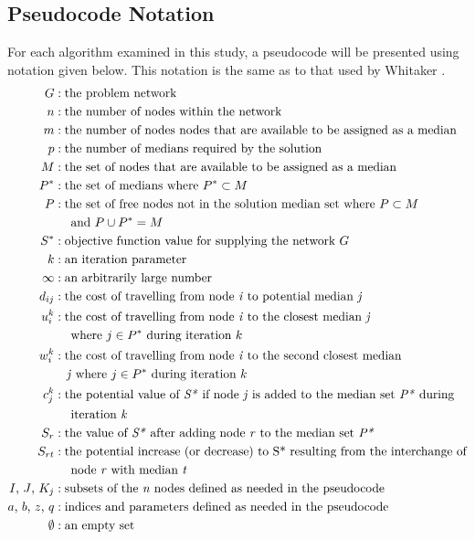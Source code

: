 \documentclass[11pt]{article}
\begin{document}
	\subsection{Pseudocode Notation} \label{pseudocode.notation}
	For each algorithm examined in this study, a pseudocode will be presented using notation given below.  This notation is the same as to that used by Whitaker \cite{WHIT83}.
	\begin{align*}
	G &: \text{the problem network}\\
	n &: \text{the number of nodes within the network}\\
	m &: \text{the number of nodes nodes that are available to be assigned as a median}\\
	p &: \text{the number of medians required by the solution}\\
	M &: \text{the set of nodes that are available to be assigned as a median}\\
	P^{*} &: \text{the set of medians where } P^{*} \subset M\\
	P &: \text{the set of free nodes not in the solution median set where } P \subset M\\
			& \quad \text{ and } P \cup P^{*} = M\\
	S^{*} &: \text{objective function value for supplying the network } G\\
	k &: \text{an iteration parameter}\\
	\infty &: \text{an arbitrarily large number}\\
	d_{ij} &: \text{the cost of travelling from node \emph{i} to potential median \emph{j}}\\
	u_{i}^{k} &: \text{the cost of travelling from node \emph{i} to the closest median \emph{j}}\\
			& \quad \text{ where } j \in P^{*} \text{ during iteration } k\\
	w_{i}^{k} &: \text{the cost of travelling from node \emph{i} to the second closest median}\\
			& \quad \text{\emph{j} where } j \in P^{*} \text{ during iteration } k\\
	c_{j}^{k} &: \text{the potential value of \emph{S*} if node \emph{j} is added to the median set \emph{P*} during}\\
			& \quad \text{ iteration \emph{k}}\\
	S_{r} &: \text{the value of \emph{S*} after adding node \emph{r} to the median set \emph{P*}}\\
	S_{rt} &: \text{the potential increase (or decrease) to S* resulting from the interchange of}\\
			& \quad \text{ node \emph{r} with median \emph{t}}\\
	I \text{, } J \text{, } K_{j} &: \text{subsets of the \emph{n} nodes defined as needed in the pseudocode}\\
	a \text{, } b \text{, } z \text{, } q &: \text{indices and parameters defined as needed in the pseudocode}\\
	\emptyset &: \text{an empty set}	
	\end{align*}
	
\end{document}

